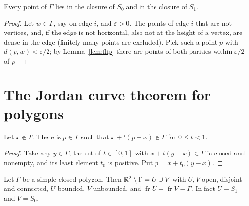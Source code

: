 
\begin{proposition}\label{prop:both-parities}
Every point of $\Gamma$ lies in the closure of $S_0$ and in the closure of $S_1$.
\end{proposition}

\begin{proof}
Let $w\in\Gamma$, say on edge $i$, and $\varepsilon>0$. The points of edge $i$ that are not vertices,
and, if the edge is not horizontal, also not at the height of a vertex, are dense in the edge
(finitely many points are excluded). Pick such a point $p$ with $d(p,w)<\varepsilon/2$; by
Lemma~\ref{lem:flip} there are points of both parities within $\varepsilon/2$ of $p$.
\end{proof}


\section{The Jordan curve theorem for polygons}

\begin{lemma}\label{lem:first-hit}
Let $x\notin\Gamma$. There is $p\in\Gamma$ such that $x+t(p-x)\notin\Gamma$ for $0\le t<1$.
\end{lemma}

\begin{proof}
Take any $y\in\Gamma$; the set of $t\in[0,1]$ with $x+t(y-x)\in\Gamma$ is closed and nonempty, and
its least element $t_0$ is positive. Put $p=x+t_0(y-x)$.
\end{proof}


\begin{theorem}\label{thm:jct-poly}
Let $\Gamma$ be a simple closed polygon. Then $\mathbb{R}^2\setminus\Gamma=U\cup V$ with $U,V$ open, disjoint
and connected, $U$ bounded, $V$ unbounded, and $\operatorname{fr}U=\operatorname{fr}V=\Gamma$. In
fact $U=S_1$ and $V=S_0$.
\end{theorem}

